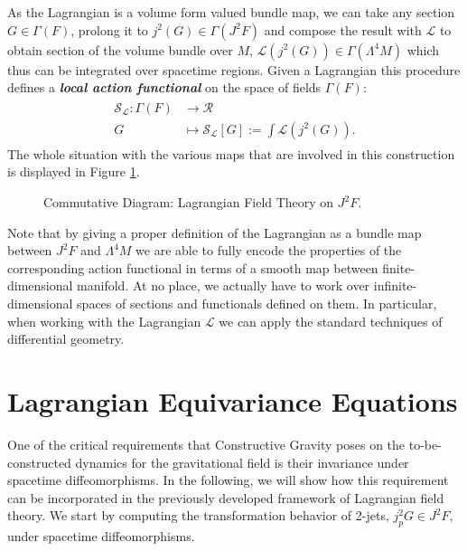 As the Lagrangian is a volume form valued bundle map, we can take any section $G \in \Gamma(F)$, prolong it to $j^2(G) \in \Gamma(J^2F)$ and compose the result with $\mathcal{L}$ to obtain section of the volume bundle over $M$, $\mathcal{L}(j^2(G)) \in \Gamma(\Lambda^4M)$ which thus can be integrated over spacetime regions. Given a Lagrangian this procedure defines a \textit{\textbf{local action functional}} on the space of fields $\Gamma(F)$:
\begin{align}
\begin{aligned}
    \mathcal{S}_{\mathcal{L}} : \Gamma(F) &\longrightarrow \mathcal{R} \\
    G &\longmapsto \mathcal{S}_{\mathcal{L}}[G] := \int \mathcal{L}(j^2(G)).
\end{aligned}
\end{align}
The whole situation with the various maps that are involved in this construction is displayed in Figure \ref{diagram1}. 
\begin{figure}[hbt!]
\centering
{}
\caption{Commutative Diagram: Lagrangian Field Theory on $J^2F$.} \label{diagram1}
\end{figure}
Note that by giving a proper definition of the Lagrangian as a bundle map between $J^2F$ and $\Lambda^4M$ we are able to fully encode the properties of the corresponding action functional in terms of a smooth map between finite-dimensional manifold. At no place, we actually have to work over infinite-dimensional spaces of sections and functionals defined on them. In particular, when working with the Lagrangian $\mathcal{L}$ we can apply the standard techniques of differential geometry. 
\section{Lagrangian Equivariance Equations}
One of the critical requirements that Constructive Gravity poses on the to-be-constructed dynamics for the gravitational field is their invariance under spacetime diffeomorphisms. In the following, we will show how this requirement can be incorporated in the previously developed framework of Lagrangian field theory. We start by computing the transformation behavior of 2-jets, $j_p^2G \in J^2F$, under spacetime diffeomorphisms.


